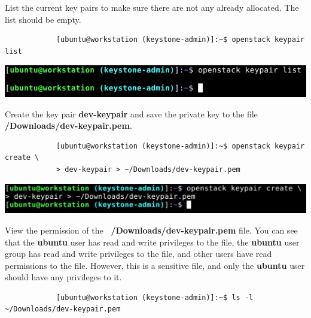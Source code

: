 \documentclass[letterpaper, 12pt]{article}
\begin{document}
\begin{enumerate}
    \begin{labstep}
        List the current key pairs to make sure there are not any already allocated.
        The list should be empty.
        \begin{lstlisting}
            [ubuntu@workstation (keystone-admin)]:~$ openstack keypair list
        \end{lstlisting}

        \begin{center}
            \includegraphics[width=\linewidth]{images/part1/step20.png}
        \end{center}
    \end{labstep}

    \begin{labstep}
        Create the key pair \textbf{dev-keypair} and save the private key to the file
        \textbf{\texttildemid/Downloads/dev-keypair.pem}.
        \begin{lstlisting}
            [ubuntu@workstation (keystone-admin)]:~$ openstack keypair create \
            > dev-keypair > ~/Downloads/dev-keypair.pem
        \end{lstlisting}

        \begin{center}
            \includegraphics[width=\linewidth]{images/part1/step21.png}
        \end{center}
    \end{labstep}

    \begin{labstep}
        View the permission of the \textbf{~/Downloads/dev-keypair.pem} file.
        You can see that the \textbf{ubuntu} user has read and write privileges to the file, the \textbf{ubuntu} user group has read and write privileges to the file, and other users have read permissions to the file.
        However, this is a sensitive file, and only the \textbf{ubuntu} user should have any privileges to it.
        \begin{lstlisting}
            [ubuntu@workstation (keystone-admin)]:~$ ls -l ~/Downloads/dev-keypair.pem
        \end{lstlisting}


\end{labstep}
\end{enumerate}
\end{document}
